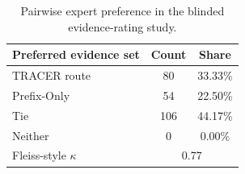 \begin{table}[t]
\centering
\caption{Pairwise expert preference in the blinded evidence-rating study.}
\label{tab:blinded-expert-preference}
\begin{tabular}{lcc}
\toprule
Preferred evidence set & Count & Share \\
\midrule
TRACER route & 80 & 33.33\% \\
Prefix-Only & 54 & 22.50\% \\
Tie & 106 & 44.17\% \\
Neither & 0 & 0.00\% \\
\midrule
Fleiss-style $\kappa$ & \multicolumn{2}{c}{0.77} \\
\bottomrule
\end{tabular}
\end{table}
